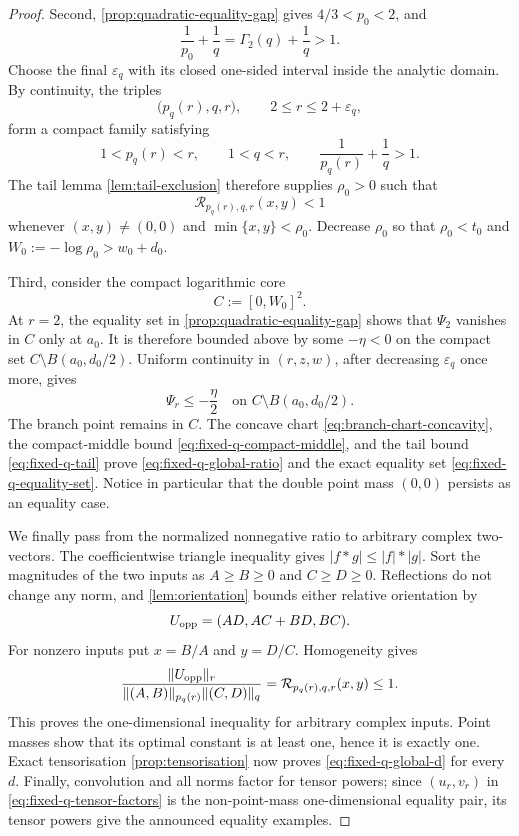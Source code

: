\documentclass[11pt,reqno]{amsart}
\numberwithin{equation}{section}
\theoremstyle{definition}
\theoremstyle{remark}
\begin{document}
\begin{proof}
Second, \cref{prop:quadratic-equality-gap} gives $4/3<p_0<2$, and
\[
  \frac1{p_0}+\frac1q
  =\Gamma_2(q)+\frac1q>1.
\]
Choose the final $\varepsilon_q$ with its closed one-sided interval inside the
analytic domain.  By continuity, the triples
\[
  \bigl(p_q(r),q,r\bigr),\qquad 2\le r\le2+\varepsilon_q,
\]
form a compact family satisfying
\[
  1<p_q(r)<r,\qquad 1<q<r,\qquad
  \frac1{p_q(r)}+\frac1q>1.
\]
The tail lemma \cref{lem:tail-exclusion} therefore supplies $\rho_0>0$ such
that
\begin{equation}\label{eq:fixed-q-tail}
  \mathcal R_{p_q(r),q,r}(x,y)<1
\end{equation}
whenever $(x,y)\ne(0,0)$ and $\min\{x,y\}<\rho_0$.  Decrease $\rho_0$ so that
$\rho_0<t_0$ and $W_0:=-\log\rho_0>w_0+d_0$.

Third, consider the compact logarithmic core
\[
  C:=[0,W_0]^2.
\]
At $r=2$, the equality set in
\cref{prop:quadratic-equality-gap} shows that $\Psi_2$ vanishes in $C$ only at
$a_0$.  It is therefore bounded above by some $-\eta<0$ on the compact set
$C\setminus B(a_0,d_0/2)$.  Uniform continuity in $(r,z,w)$, after decreasing
$\varepsilon_q$ once more, gives
\begin{equation}\label{eq:fixed-q-compact-middle}
  \Psi_r\le-\frac{\eta}{2}
  \quad\text{on }C\setminus B(a_0,d_0/2).
\end{equation}
The branch point remains in $C$.  The concave chart
\eqref{eq:branch-chart-concavity}, the compact-middle bound
\eqref{eq:fixed-q-compact-middle}, and the tail bound
\eqref{eq:fixed-q-tail} prove \eqref{eq:fixed-q-global-ratio} and the exact
equality set \eqref{eq:fixed-q-equality-set}.  Notice in particular that the
double point mass $(0,0)$ persists as an equality case.

We finally pass from the normalized nonnegative ratio to arbitrary complex
two-vectors.  The coefficientwise triangle inequality gives
$|f*g|\le |f|*|g|$.  Sort the magnitudes of the two inputs as
$A\ge B\ge0$ and $C\ge D\ge0$.  Reflections do not change any norm, and
\cref{lem:orientation} bounds either relative orientation by
\[
  U_{\rm opp}=(AD,AC+BD,BC).
\]
For nonzero inputs put $x=B/A$ and $y=D/C$.  Homogeneity gives
\[
  \frac{\|U_{\rm opp}\|_r}
  {\|(A,B)\|_{p_q(r)}\|(C,D)\|_q}
  =\mathcal R_{p_q(r),q,r}(x,y)\le1.
\]
This proves the one-dimensional inequality for arbitrary complex inputs.
Point masses show that its optimal constant is at least one, hence it is
exactly one.  Exact tensorisation \cref{prop:tensorisation} now proves
\eqref{eq:fixed-q-global-d} for every $d$.  Finally, convolution and all norms
factor for tensor powers; since $(u_r,v_r)$ in
\eqref{eq:fixed-q-tensor-factors} is the non-point-mass one-dimensional
equality pair, its tensor powers give the announced equality examples.
\end{proof}
\end{document}
